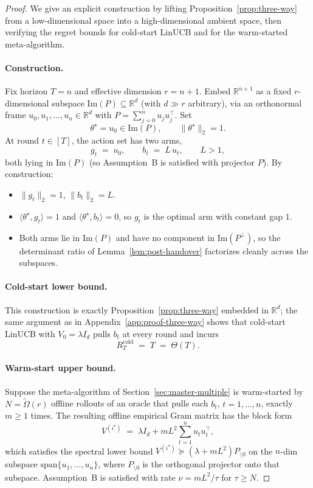 \documentclass{article}
\theoremstyle{definition}
\theoremstyle{remark}
\theoremstyle{remark}
\begin{document}
\begin{proof}
We give an explicit construction by lifting Proposition~\ref{prop:three-way}
from a low-dimensional space into a high-dimensional ambient space, then
verifying the regret bounds for cold-start LinUCB and for the warm-started
meta-algorithm.

\paragraph{Construction.}
Fix horizon $T = n$ and effective dimension $r = n+1$. Embed
$\mathbb R^{n+1}$ as a fixed $r$-dimensional subspace
$\mathrm{Im}(P)\subseteq\mathbb R^d$ (with $d\gg r$ arbitrary), via an
orthonormal frame $u_0,u_1,\dots,u_{n}\in\mathbb R^d$ with
$P = \sum_{j=0}^{n} u_j u_j^\top$. Set
\[
\theta^\star = u_0\in\mathrm{Im}(P),\qquad \|\theta^\star\|_2=1.
\]
At round $t\in[T]$, the action set has two arms,
\[
g_t \;=\; u_0,
\qquad
b_t \;=\; L\,u_t,\qquad L>1,
\]
both lying in $\mathrm{Im}(P)$ (so Assumption~B is satisfied with
projector $P$). By construction:
\begin{itemize}
\item $\|g_t\|_2 = 1$, $\|b_t\|_2 = L$.
\item $\langle\theta^\star,g_t\rangle = 1$ and
$\langle\theta^\star,b_t\rangle = 0$, so $g_t$ is the optimal arm
with constant gap $1$.
\item Both arms lie in $\mathrm{Im}(P)$ and have no component in
$\mathrm{Im}(P^\perp)$, so the determinant ratio of
Lemma~\ref{lem:post-handover} factorizes cleanly across the
subspaces.
\end{itemize}

\paragraph{Cold-start lower bound.}
This construction is exactly Proposition~\ref{prop:three-way} embedded
in $\mathbb R^d$; the same argument as in
Appendix~\ref{app:proof-three-way} shows that cold-start LinUCB with
$V_0=\lambda I_d$ pulls $b_t$ at every round and incurs
\[
R_T^{\mathrm{cold}} \;=\; T \;=\; \Theta(T).
\]

\paragraph{Warm-start upper bound.}
Suppose the meta-algorithm of Section~\ref{sec:master-multiple} is
warm-started by $N=\widetilde\Omega(r)$ offline rollouts of an oracle
that pulls each $b_t$, $t=1,\dots,n$, exactly $m\ge 1$ times. The
resulting offline empirical Gram matrix has the block form
\[
V^{(i^\star)} \;=\; \lambda I_d + mL^2\sum_{t=1}^{n} u_t u_t^\top,
\]
which satisfies the spectral lower bound
$V^{(i^\star)}\succeq(\lambda+mL^2)P_{\setminus 0}$ on the $n$-dim
subspace $\mathrm{span}\{u_1,\dots,u_n\}$, where $P_{\setminus 0}$ is
the orthogonal projector onto that subspace. Assumption~B is
satisfied with rate $\nu = mL^2/\tau$ for $\tau\ge N$.


\end{proof}
\end{document}
